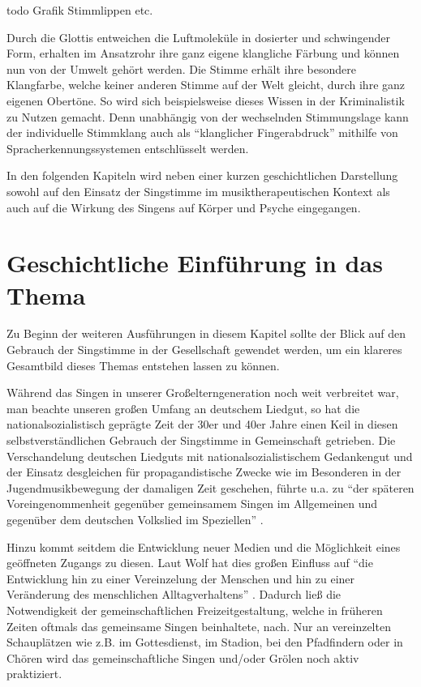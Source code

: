 todo Grafik Stimmlippen etc.

Durch die Glottis entweichen die Luftmoleküle in dosierter und schwingender Form, erhalten im Ansatzrohr ihre ganz eigene klangliche Färbung und können nun von der Umwelt gehört werden. Die Stimme erhält ihre besondere Klangfarbe, welche keiner anderen Stimme auf der Welt gleicht, durch ihre ganz eigenen Obertöne. So wird sich beispielsweise dieses Wissen in der Kriminalistik zu Nutzen gemacht. Denn unabhängig von der wechselnden Stimmungslage kann der individuelle Stimmklang auch als "`klanglicher Fingerabdruck"' \autocite[482]{rittner2009a} mithilfe von Spracherkennungssystemen entschlüsselt werden. 

In den folgenden Kapiteln wird neben einer kurzen geschichtlichen Darstellung sowohl auf den Einsatz der Singstimme im musiktherapeutischen Kontext als auch auf die Wirkung des Singens auf Körper und Psyche eingegangen.

\section{Geschichtliche Einführung in das Thema}
Zu Beginn der weiteren Ausführungen in diesem Kapitel sollte der Blick auf den Gebrauch der Singstimme in der Gesellschaft gewendet werden, um ein klareres Gesamtbild dieses Themas entstehen lassen zu können.

Während das Singen in unserer Großelterngeneration noch weit verbreitet war, man beachte unseren großen Umfang an deutschem Liedgut, so hat die nationalsozialistisch geprägte Zeit der 30er und 40er Jahre einen Keil in diesen selbstverständlichen Gebrauch der Singstimme in Gemeinschaft getrieben.
Die Verschandelung deutschen Liedguts mit nationalsozialistischem Gedankengut und der Einsatz desgleichen für propagandistische Zwecke wie im Besonderen in der Jugendmusikbewegung der damaligen Zeit geschehen, führte u.a. zu "`der späteren Voreingenommenheit gegenüber gemeinsamem Singen im Allgemeinen und gegenüber dem deutschen Volkslied im Speziellen"' \autocite[9]{wolf2012}.

Hinzu kommt seitdem die Entwicklung neuer Medien und die Möglichkeit eines geöffneten Zugangs zu diesen. Laut Wolf hat dies großen Einfluss auf "`die Entwicklung hin zu einer Vereinzelung der Menschen und hin zu einer Veränderung des menschlichen Alltagverhaltens"' \autocite[10]{wolf2012}. Dadurch ließ die Notwendigkeit der gemeinschaftlichen Freizeitgestaltung, welche in früheren Zeiten oftmals das gemeinsame Singen beinhaltete, nach. Nur an vereinzelten Schauplätzen wie z.B. im Gottesdienst, im Stadion, bei den Pfadfindern oder in Chören wird das gemeinschaftliche Singen und/oder Grölen noch aktiv praktiziert.

